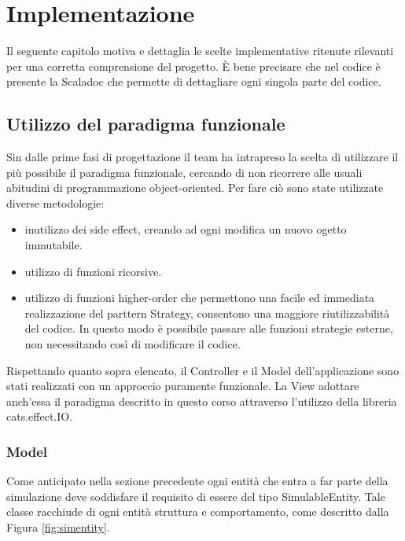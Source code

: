 \chapter{Implementazione}
Il seguente capitolo motiva e dettaglia le scelte implementative ritenute rilevanti per una corretta comprensione del progetto. È bene precisare che nel codice è presente la Scaladoc che permette di dettagliare ogni singola parte del codice.

\section{Utilizzo del paradigma funzionale}
Sin dalle prime fasi di progettazione il team ha intrapreso la scelta di utilizzare il più possibile il paradigma funzionale, cercando di non ricorrere alle usuali abitudini di programmazione object-oriented. Per fare ciò sono state utilizzate diverse metodologie: 
\begin{itemize}
    \item inutilizzo dei side effect, creando ad ogni modifica un nuovo ogetto immutabile.
    \item utilizzo di funzioni ricorsive.
    \item utilizzo di funzioni higher-order che permettono una facile ed immediata realizzazione del parttern Strategy, consentono una maggiore riutilizzabilità del codice. In questo modo è possibile passare alle funzioni strategie esterne, non necessitando così di modificare il codice.
\end{itemize}

Rispettando quanto sopra elencato, il Controller e il Model dell'applicazione sono stati realizzati con un approccio puramente funzionale. La View adottare anch'essa il paradigma descritto in questo corso attraverso l'utilizzo della libreria cats.effect.IO.

\subsection{Model}

Come anticipato nella sezione precedente ogni entità che entra a far parte della simulazione deve soddisfare il requisito di essere del tipo SimulableEntity. Tale classe racchiude di ogni entità struttura e comportamento, come descritto dalla Figura \ref{fig:simentity}. 



